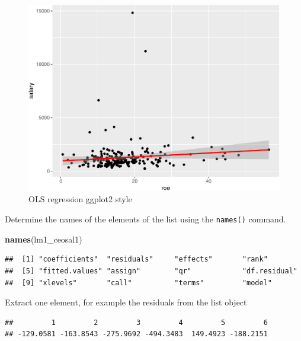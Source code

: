 \documentclass[]{book}
\newenvironment{Shaded}{\begin{snugshade}}{\end{snugshade}}
\newcommand{\CommentTok}[1]{\textcolor[rgb]{0.56,0.35,0.01}{\textit{#1}}}
\newcommand{\KeywordTok}[1]{\textcolor[rgb]{0.13,0.29,0.53}{\textbf{#1}}}
\newcommand{\NormalTok}[1]{#1}
\newcommand{\OperatorTok}[1]{\textcolor[rgb]{0.81,0.36,0.00}{\textbf{#1}}}
\begin{document}
\begin{figure}

{\centering \includegraphics[width=0.8\linewidth]{MEM5220_R_files/figure-latex/fig2-1} 

}

\caption{OLS regression ggplot2 style}\label{fig:fig2}
\end{figure}

Determine the names of the elements of the list using the \texttt{names()} command.

\begin{Shaded}
\begin{Highlighting}[]
\KeywordTok{names}\NormalTok{(lm1_ceosal1)}
\end{Highlighting}
\end{Shaded}

\begin{verbatim}
##  [1] "coefficients"  "residuals"     "effects"       "rank"         
##  [5] "fitted.values" "assign"        "qr"            "df.residual"  
##  [9] "xlevels"       "call"          "terms"         "model"
\end{verbatim}

Extract one element, for example the residuals from the list object

\begin{Shaded}
\end{Shaded}

\begin{verbatim}
##         1         2         3         4         5         6 
## -129.0581 -163.8543 -275.9692 -494.3483  149.4923 -188.2151
\end{verbatim}
\end{document}
